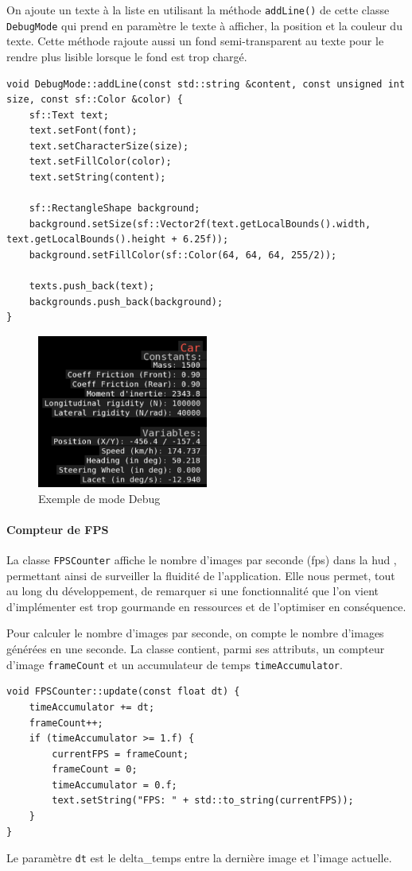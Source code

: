 On ajoute un texte à la liste en utilisant la méthode \texttt{addLine()} de cette classe \texttt{DebugMode} qui prend en paramètre le texte à afficher, la position et la couleur du texte.
Cette méthode rajoute aussi un fond semi-transparent au texte pour le rendre plus lisible lorsque le fond est trop chargé.

\begin{lstlisting}[style=CStyle, label={lst:code_addline}]
void DebugMode::addLine(const std::string &content, const unsigned int size, const sf::Color &color) {
    sf::Text text;
    text.setFont(font);
    text.setCharacterSize(size);
    text.setFillColor(color);
    text.setString(content);

    sf::RectangleShape background;
    background.setSize(sf::Vector2f(text.getLocalBounds().width, text.getLocalBounds().height + 6.25f));
    background.setFillColor(sf::Color(64, 64, 64, 255/2));

    texts.push_back(text);
    backgrounds.push_back(background);
}
\end{lstlisting}
\begin{figure}[H]
    \centering
    \includegraphics[width=0.5\textwidth]{resources/example_debug_mode_1}
    \caption{Exemple de mode Debug}
    \label{fig:debug_mode}
\end{figure}

\paragraph{Compteur de FPS}
La classe \texttt{FPSCounter} affiche le nombre d'images par seconde (\gls{fps}) dans la \gls{hud} , permettant ainsi de surveiller la fluidité de l'application.
Elle nous permet, tout au long du développement, de remarquer si une fonctionnalité que l'on vient d'implémenter est trop gourmande en ressources et de l'optimiser en conséquence.

Pour calculer le nombre d'images par seconde, on compte le nombre d'images générées en une seconde.
La classe contient, parmi ses attributs, un compteur d'image \texttt{frameCount} et un accumulateur de temps \texttt{timeAccumulator}.
\begin{lstlisting}[style=CStyle, label={lst:code_fpscounter}]
void FPSCounter::update(const float dt) {
    timeAccumulator += dt;
    frameCount++;
    if (timeAccumulator >= 1.f) {
        currentFPS = frameCount;
        frameCount = 0;
        timeAccumulator = 0.f;
        text.setString("FPS: " + std::to_string(currentFPS));
    }
}
\end{lstlisting}
Le paramètre \texttt{dt} est le \gls{delta_temps} entre la dernière image et l'image actuelle.

